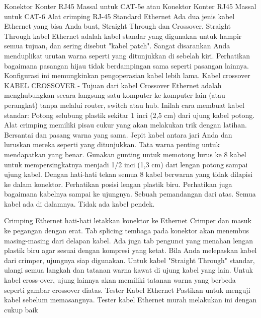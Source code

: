 Konektor Konter RJ45 Massal untuk CAT-5e atau Konektor Konter RJ45 Massal untuk CAT-6
Alat crimping RJ-45
Standard Ethernet Ada dua jenis kabel Ethernet yang bisa Anda buat, Straight Through dan Crossover.
Straight Through kabel Ethernet adalah kabel standar yang digunakan untuk hampir semua tujuan, dan sering disebut "kabel patch". Sangat disarankan Anda menduplikat urutan warna seperti yang ditunjukkan di sebelah kiri. Perhatikan bagaimana pasangan hijau tidak berdampingan sama seperti pasangan lainnya. Konfigurasi ini memungkinkan pengoperasian kabel lebih lama.
Kabel crossover
KABEL CROSSOVER - Tujuan dari kabel Crossover Ethernet adalah menghubungkan secara langsung satu komputer ke komputer lain (atau perangkat) tanpa melalui router, switch atau hub.
Inilah cara membuat kabel standar:
Potong selubung plastik sekitar 1 inci (2,5 cm) dari ujung kabel potong. Alat crimping memiliki pisau cukur yang akan melakukan trik dengan latihan.
Bersantai dan pasang warna yang sama.
Jepit kabel antara jari Anda dan luruskan mereka seperti yang ditunjukkan. Tata warna penting untuk mendapatkan yang benar.
Gunakan gunting untuk memotong lurus ke 8 kabel untuk mempersingkatnya menjadi 1/2 inci (1,3 cm) dari lengan potong sampai ujung kabel.
Dengan hati-hati tekan semua 8 kabel berwarna yang tidak dilapisi ke dalam konektor. Perhatikan posisi lengan plastik biru. Perhatikan juga bagaimana kabelnya sampai ke ujungnya.
Sebuah pemandangan dari atas. Semua kabel ada di dalamnya. Tidak ada kabel pendek.
 

Crimping Ethernet
hati-hati letakkan konektor ke Ethernet Crimper dan masuk ke pegangan dengan erat. Tab splicing tembaga pada konektor akan menembus masing-masing dari delapan kabel. Ada juga tab pengunci yang menahan lengan plastik biru agar sesuai dengan kompresi yang ketat. Bila Anda melepaskan kabel dari crimper, ujungnya siap digunakan.
Untuk kabel "Straight Through" standar, ulangi semua langkah dan tatanan warna kawat di ujung kabel yang lain. Untuk kabel cross-over, ujung lainnya akan memiliki tatanan warna yang berbeda seperti gambar crossover diatas.
Tester Kabel Ethernet
Pastikan untuk menguji kabel sebelum memasangnya. Tester kabel Ethernet murah melakukan ini dengan cukup baik

